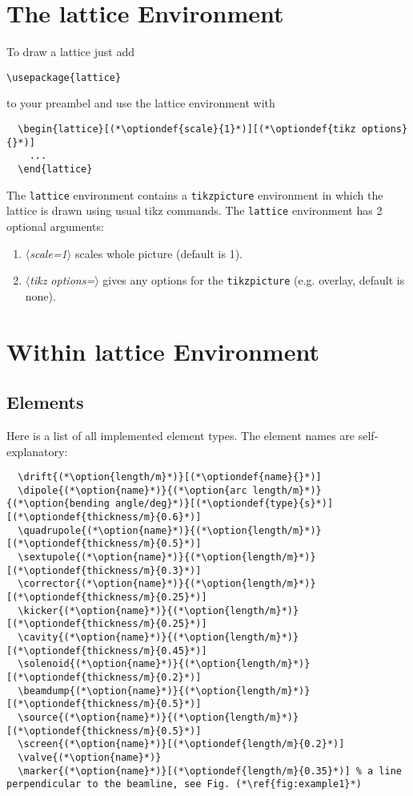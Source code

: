 \documentclass[a4paper]{scrartcl}
\newcommand{\option}[1]{{\color{blue}$\langle$\textit{#1}$\rangle$}}
\newcommand{\optiondef}[2]{{\color{green!50!black}$\langle$\textit{#1=#2}$\rangle$}}
\begin{document}
\section{The lattice Environment}
\label{sec-4}

To draw a lattice just add
\begin{lstlisting}
\usepackage{lattice}
\end{lstlisting}
to your preambel and use the lattice environment with
\begin{lstlisting}
  \begin{lattice}[(*\optiondef{scale}{1}*)][(*\optiondef{tikz options}{}*)]
    ...
  \end{lattice}
\end{lstlisting}
The \lstinline+lattice+ environment contains a \lstinline+tikzpicture+ environment in
which the lattice is drawn using usual tikz commands. The \lstinline+lattice+ environment
has 2 optional arguments:
\begin{enumerate}
\item \optiondef{scale}{1} scales whole picture (default is 1).
\item \optiondef{tikz options}{} gives any options for the \lstinline+tikzpicture+ (e.g.
  overlay, default is none).
\end{enumerate}


\section{Within lattice Environment}
\label{sec-5}

\subsection{Elements}
\label{sec-5-1}

 Here is a list of all implemented element types. The element names are self-explanatory:
\begin{lstlisting}
  \drift{(*\option{length/m}*)}[(*\optiondef{name}{}*)]
  \dipole{(*\option{name}*)}{(*\option{arc length/m}*)}{(*\option{bending angle/deg}*)}[(*\optiondef{type}{s}*)][(*\optiondef{thickness/m}{0.6}*)]
  \quadrupole{(*\option{name}*)}{(*\option{length/m}*)}[(*\optiondef{thickness/m}{0.5}*)]
  \sextupole{(*\option{name}*)}{(*\option{length/m}*)}[(*\optiondef{thickness/m}{0.3}*)]
  \corrector{(*\option{name}*)}{(*\option{length/m}*)}[(*\optiondef{thickness/m}{0.25}*)]
  \kicker{(*\option{name}*)}{(*\option{length/m}*)}[(*\optiondef{thickness/m}{0.25}*)]
  \cavity{(*\option{name}*)}{(*\option{length/m}*)}[(*\optiondef{thickness/m}{0.45}*)]
  \solenoid{(*\option{name}*)}{(*\option{length/m}*)}[(*\optiondef{thickness/m}{0.2}*)]
  \beamdump{(*\option{name}*)}{(*\option{length/m}*)}[(*\optiondef{thickness/m}{0.5}*)]
  \source{(*\option{name}*)}{(*\option{length/m}*)}[(*\optiondef{thickness/m}{0.5}*)]
  \screen{(*\option{name}*)}[(*\optiondef{length/m}{0.2}*)]
  \valve{(*\option{name}*)}
  \marker{(*\option{name}*)}[(*\optiondef{length/m}{0.35}*)] % a line perpendicular to the beamline, see Fig. (*\ref{fig:example1}*)
\end{lstlisting}
\end{document}
